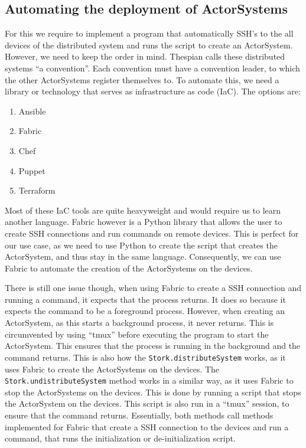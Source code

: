 \documentclass[a4paper]{article}
\begin{document}
\subsection{Automating the deployment of ActorSystems}
For this we require to implement a program that automatically SSH's to the all devices of the distributed system and runs the script to create an ActorSystem. However, we need to keep the order in mind. Thespian calls these distributed systems \enquote{a convention}. Each convention must have a convention leader, to which the other ActorSystems register themselves to.
To automate this, we need a library or technology that serves as infrastructure as code (IaC). The options are:
\begin{enumerate}
    \item Ansible
    \item Fabric
    \item Chef
    \item Puppet
    \item Terraform
\end{enumerate}
Most of these IaC tools are quite heavyweight and would require us to learn another language. Fabric however is a Python library that allows the user to create SSH connections and run commands on remote devices. This is perfect for our use case, as we need to use Python to create the script that creates the ActorSystem, and thus stay in the same language. Consequently, we can use Fabric to automate the creation of the ActorSystems on the devices.

There is still one issue though, when using Fabric to create a SSH connection and running a command, it expects that the process returns. It does so because it expects the command to be a foreground process. However, when creating an ActorSystem, as this starts a background process, it never returns. This is circumvented by using \enquote{tmux} before executing the program to start the ActorSystem. This ensures that the process is running in the background and the command returns. This is also how the \lstinline|Stork.distributeSystem| works, as it uses Fabric to create the ActorSystems on the devices. The \lstinline|Stork.undistributeSystem| method works in a similar way, as it uses Fabric to stop the ActorSystems on the devices. This is done by running a script that stops the ActorSystem on the devices. This script is also run in a \enquote{tmux} session, to ensure that the command returns. Essentially, both methods call methods implemented for Fabric that create a SSH connection to the devices and run a command, that runs the initialization or de-initialization script.
\end{document}
